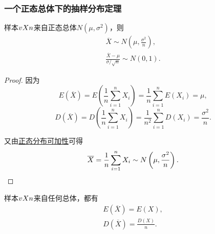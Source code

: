\subsubsection{一个正态总体下的抽样分布定理}
\begin{theorem}
样本\(v{X}{n}\)来自正态总体\(N(\mu,\sigma^2)\)，则\begin{gather}
\overline{X} \sim N\left(\mu,\frac{\sigma^2}{n}\right), \\
\frac{\overline{X}-\mu}{\sigma / \sqrt{n}} \sim N(0,1).
\end{gather}
\begin{proof}
因为\[
E(\overline{X})=E\left(\frac{1}{n} \sum\limits_{i=1}^n X_i\right) = \frac{1}{n} \sum\limits_{i=1}^n E(X_i) = \mu,
\]\[
D(\overline{X})=D\left(\frac{1}{n} \sum\limits_{i=1}^n X_i\right) = \frac{1}{n^2} \sum\limits_{i=1}^n D(X_i) = \frac{\sigma^2}{n}.
\]

又由\hyperref[theorem:正态分布与自然指数分布族.正态分布的可加性2]{正态分布可加性}可得\[
\overline{X} = \frac{1}{n} \sum\limits_{i=1}^n X_i
\sim N\left(\mu,\frac{\sigma^2}{n}\right).
\qedhere
\]
\end{proof}
\end{theorem}

\begin{corollary}
样本\(v{X}{n}\)来自任何总体，都有\begin{gather}
E(\overline{X}) = E(X), \\
D(\overline{X}) = \frac{D(X)}{n}.
\end{gather}
\end{corollary}

